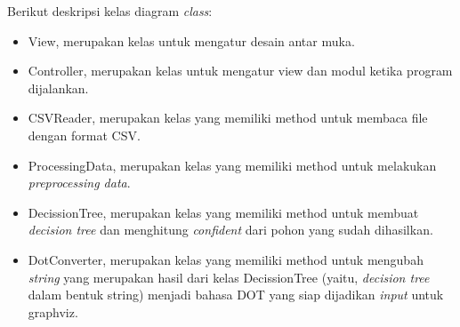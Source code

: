 Berikut deskripsi kelas diagram \textsl{class}:
\begin{itemize}
	\item View, merupakan kelas untuk mengatur desain antar muka.
	\item Controller, merupakan kelas untuk mengatur view dan modul ketika program dijalankan.
	\item CSVReader, merupakan kelas yang memiliki method untuk membaca file dengan format CSV.
	\item ProcessingData, merupakan kelas yang memiliki method untuk melakukan \textsl{preprocessing data}.
	\item DecissionTree, merupakan kelas yang memiliki method untuk membuat \textsl{decision tree} dan menghitung \textsl{confident} dari pohon yang sudah dihasilkan.
	\item DotConverter, merupakan kelas yang memiliki method untuk mengubah \textsl{string} yang merupakan hasil dari kelas DecissionTree (yaitu, \textsl{decision tree} dalam bentuk string) menjadi bahasa DOT yang siap dijadikan \textsl{input} untuk graphviz.
\end{itemize}
	
















